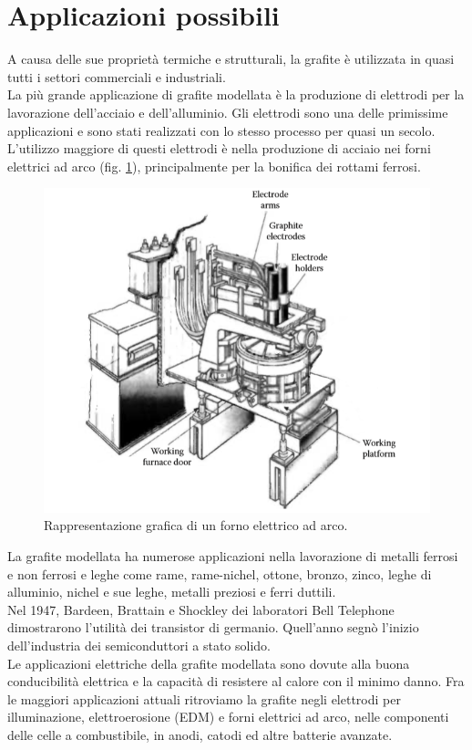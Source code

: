 \documentclass[a4paper,titlepage]{book}
\begin{document}
\section{Applicazioni possibili}

A causa delle sue proprietà termiche e strutturali, la grafite è utilizzata in quasi tutti i settori commerciali e industriali. \\

La più grande applicazione di grafite modellata è la produzione di elettrodi per la lavorazione dell'acciaio e dell'alluminio. Gli elettrodi sono una delle primissime applicazioni e sono stati realizzati con lo stesso processo per quasi un secolo. \\
L'utilizzo maggiore di questi elettrodi è nella produzione di acciaio nei forni elettrici ad arco (fig. \ref{arc}), principalmente per la bonifica dei rottami ferrosi. \\
\begin{figure}[h!] 
	\centering
	\includegraphics[width=0.6\columnwidth]{electricarc.png}
	\caption{ 	\label{arc}
		Rappresentazione grafica di un forno elettrico ad arco.
	}
\end{figure} 
La grafite modellata ha numerose applicazioni nella lavorazione di metalli ferrosi e non ferrosi e leghe come rame, rame-nichel, ottone, bronzo, zinco, leghe di alluminio, nichel e sue leghe, metalli preziosi e ferri duttili.\\
 Nel 1947, Bardeen, Brattain e Shockley dei laboratori Bell Telephone dimostrarono l'utilità dei transistor di germanio. Quell'anno segnò l'inizio dell'industria dei semiconduttori a stato solido.\\

Le applicazioni elettriche della grafite modellata sono dovute alla buona conducibilità elettrica e la capacità di resistere al calore con il minimo danno. Fra le maggiori applicazioni attuali ritroviamo la grafite negli elettrodi per illuminazione, elettroerosione (EDM) e forni elettrici ad arco, nelle componenti delle celle a combustibile, in anodi, catodi ed altre batterie avanzate.\\
\end{document}

